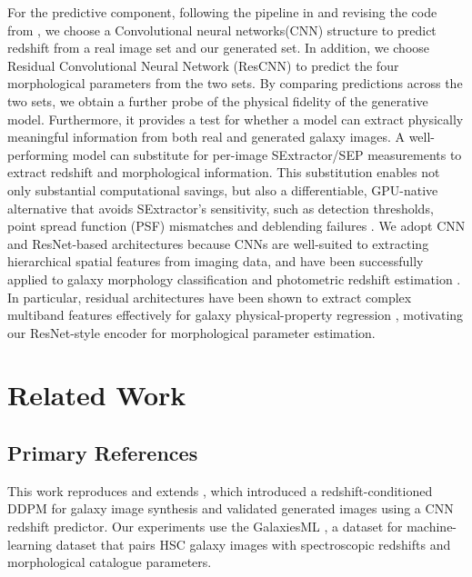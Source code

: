 \documentclass[fleqn,usenatbib]{mnras}
\begin{document}
For the predictive component, following the pipeline in \citep{lizarraga2024} and revising the code from \citep {li2024}, we choose a Convolutional neural networks(CNN) structure to predict redshift from a real image set and our generated set. In addition, we choose Residual Convolutional Neural Network (ResCNN) to predict the four morphological parameters from the two sets. By comparing predictions across the two sets, we obtain a further probe of the physical fidelity of the generative model. Furthermore, it provides a test for whether a model can extract physically meaningful information from both real and generated galaxy images. A well-performing model can substitute for per-image SExtractor/SEP measurements \citep{barbary2016, bertin1996} to extract redshift and morphological information. This substitution enables not only substantial computational savings, but also a differentiable, GPU-native alternative that avoids SExtractor's sensitivity, such as detection thresholds, point spread function (PSF) mismatches and deblending failures \citep{haigh2021, melchior2018, xue2023}.  We adopt CNN and ResNet-based architectures because CNNs are well-suited to extracting hierarchical spatial features from imaging data, and have been successfully applied to galaxy morphology classification and photometric redshift estimation \citep{dieleman2015, dominguezsanchez2018, nishizawa2020}. In particular, residual architectures \citep{he2016} have been shown to extract complex multiband features effectively for galaxy physical-property regression \citep{zou2025}, motivating our ResNet-style encoder for morphological parameter estimation.










\section{Related Work}
\label{sec:related_work}

\subsection{Primary References}

This work reproduces and extends \citet{lizarraga2024}, which introduced a
redshift-conditioned DDPM for galaxy image synthesis and validated generated
images using a CNN redshift predictor.
Our experiments use the GalaxiesML \citep{li2024a}, a dataset for
machine-learning dataset that pairs HSC galaxy images with spectroscopic
redshifts and morphological catalogue parameters.
\end{document}
